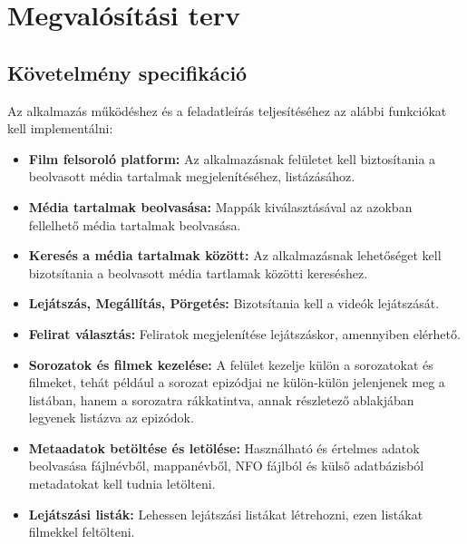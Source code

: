 \section{Megvalósítási terv}

\subsection{Követelmény specifikáció}
Az alkalmazás működéshez és a feladatleírás teljesítéséhez az alábbi funkciókat kell implementálni:
\begin{itemize}
    \item {\textbf {Film felsoroló platform: }} Az alkalmazásnak felületet kell biztosítania a beolvasott média tartalmak megjelenítéséhez, listázásához.
    \item {\textbf {Média tartalmak beolvasása: }} Mappák kiválasztásával az azokban fellelhető média tartalmak beolvasása.
	\item {\textbf {Keresés a média tartalmak között: }} Az alkalmazásnak lehetőséget kell bizotsítania a beolvasott média tartlamak közötti kereséshez.
	\item {\textbf {Lejátszás, Megállítás, Pörgetés: }} Bizotsítania kell a videók lejátszását.
	\item {\textbf {Felirat választás: }} Feliratok megjelenítése lejátszáskor, amennyiben elérhető.
	\item {\textbf {Sorozatok és filmek kezelése: }} A felület kezelje külön a sorozatokat és filmeket, tehát például a sorozat epizódjai ne külön-külön jelenjenek meg a listában, hanem a sorozatra rákkatintva, annak részletező ablakjában legyenek listázva az epizódok.
	\item {\textbf {Metaadatok betöltése és letölése: }} Használható és értelmes adatok beolvasása fájlnévből, mappanévből, NFO fájlból és külső adatbázisból metadatokat kell tudnia letölteni.
    \item {\textbf {Lejátszási listák: }} Lehessen lejátszási listákat létrehozni, ezen listákat filmekkel feltölteni.
\end{itemize}

